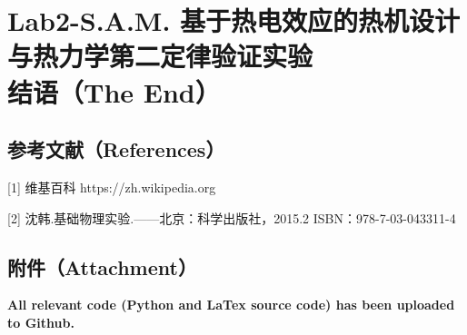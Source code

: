 \documentclass[dvipsnames, svgnames,a4paper,11pt]{article}
\begin{document}
	
	
	
	
	
	
	\section{Lab2-S.A.M. 基于热电效应的热机设计与热力学第二定律验证实验\\ \quad\heiti 结语（The End）}
	
	
	
	\subsection{参考文献（References）}
	[1] 维基百科 https://zh.wikipedia.org
	
	[2] 沈韩.基础物理实验.——北京：科学出版社，2015.2 ISBN：978-7-03-043311-4
	
	
	\subsection{附件（Attachment）}
	
	
	
	\textbf{All relevant code (Python and LaTex source code) has been uploaded to Github.}
	
	
	
\end{document}
